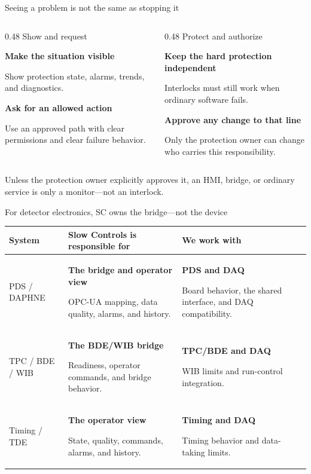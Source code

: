 \documentclass[aspectratio=169,11pt]{beamer}
\newcommand{\OwnerCell}[2]{%
  \RaggedRight\textbf{#1}\par{\footnotesize\color{DuneTextMuted}#2}%
}
\begin{document}
\begin{frame}{Seeing a problem is not the same as stopping it}
  \begin{columns}[T,onlytextwidth]
    \begin{column}{0.48\textwidth}
        {Show and request}
        {\textbf{Make the situation visible}\par
         Show protection state, alarms, trends, and diagnostics.\par\medskip
         \textbf{Ask for an allowed action}\par
         Use an approved path with clear permissions and clear failure behavior.}
    \end{column}
    \begin{column}{0.48\textwidth}
        {Protect and authorize}
        {\textbf{Keep the hard protection independent}\par
         Interlocks must still work when ordinary software fails.\par\medskip
         \textbf{Approve any change to that line}\par
         Only the protection owner can change who carries this responsibility.}
    \end{column}
  \end{columns}

  \smallskip
    {Unless the protection owner explicitly approves it, an HMI, bridge, or ordinary service is only a monitor—not an interlock.}
\end{frame}

\begin{frame}{For detector electronics, SC owns the bridge—not the device}
  \small
  \renewcommand{\arraystretch}{1.20}
  \begin{tabularx}{\textwidth}{@{}p{} p{} X@{}}
    \toprule
    System & Slow Controls is responsible for & We work with \\
    \midrule
    PDS / DAPHNE &
    \OwnerCell{The bridge and operator view}{OPC-UA mapping, data quality, alarms, and history.} &
    \OwnerCell{PDS and DAQ}{Board behavior, the shared interface, and DAQ compatibility.} \\
    \addlinespace
    TPC / BDE / WIB &
    \OwnerCell{The BDE/WIB bridge}{Readiness, operator commands, and bridge behavior.} &
    \OwnerCell{TPC/BDE and DAQ}{WIB limits and run-control integration.} \\
    \addlinespace
    Timing / TDE &
    \OwnerCell{The operator view}{State, quality, commands, alarms, and history.} &
    \OwnerCell{Timing and DAQ}{Timing behavior and data-taking limits.} \\
    \bottomrule
  \end{tabularx}
\end{frame}
\end{document}
